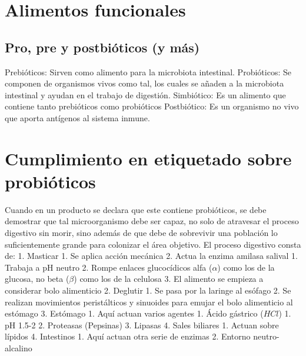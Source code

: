 \section{Alimentos funcionales}


\lipsum

\subsection{Pro, pre y postbióticos (y más)}

Prebióticos: Sirven como alimento para la microbiota intestinal.
Probióticos: Se componen de organismos vivos como tal, los cuales se añaden a la microbiota intestinal y ayudan en el trabajo de digestión.
Simbiótico: Es un alimento que contiene tanto prebióticos como probióticos
Postbiótico: Es un organismo no vivo que aporta antígenos al sistema inmune.

\section{Cumplimiento en etiquetado sobre probióticos}

Cuando en un producto se declara que este contiene probióticos, se debe demostrar que tal microorganismo debe ser capaz, no solo de atravesar el proceso digestivo sin morir, sino además de que debe de sobrevivir una población lo suficientemente grande para colonizar el área objetivo.
El proceso digestivo consta de:
1. Masticar
	1. Se aplica acción mecánica
	2. Actua la enzima amilasa salival
		1. Trabaja a pH neutro
		2. Rompe enlaces glucocídicos alfa ($\alpha$) como los de la glucosa, no beta ($\beta$) como los de la celulosa
	3. El alimento se empieza a considerar bolo alimenticio
2. Deglutir
	1. Se pasa por la laringe al esófago
	2. Se realizan movimientos peristálticos y sinuoides para emujar el bolo alimenticio al estómago
3. Estómago
	1. Aquí actuan varios agentes
		1. Ácido gástrico ($HCl$)
			1. pH 1.5-2
		2. Proteasas (Pepsinas)
		3. Lipasas
		4. Sales biliares
			1. Actuan sobre lípidos
4. Intestinos
	1. Aquí actuan otra serie de enzimas
	2. Entorno neutro-alcalino